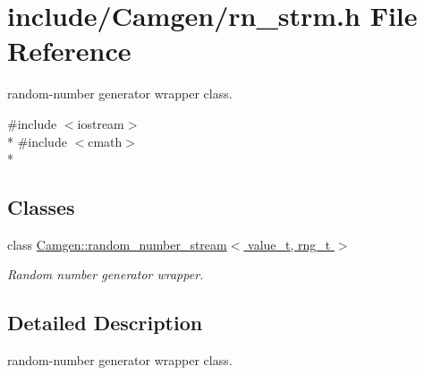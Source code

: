 \hypertarget{a00731}{\section{include/\-Camgen/rn\-\_\-strm.h File Reference}
\label{a00731}
}


random-\/number generator wrapper class.  


{\ttfamily \#include $<$iostream$>$}\\*
{\ttfamily \#include $<$cmath$>$}\\*
\subsection*{Classes}
\begin{DoxyCompactItemize}
\item 
class \hyperlink{a00460}{Camgen\-::random\-\_\-number\-\_\-stream$<$ value\-\_\-t, rng\-\_\-t $>$}
\begin{DoxyCompactList}\small\item\em Random number generator wrapper. \end{DoxyCompactList}\end{DoxyCompactItemize}


\subsection{Detailed Description}
random-\/number generator wrapper class. 